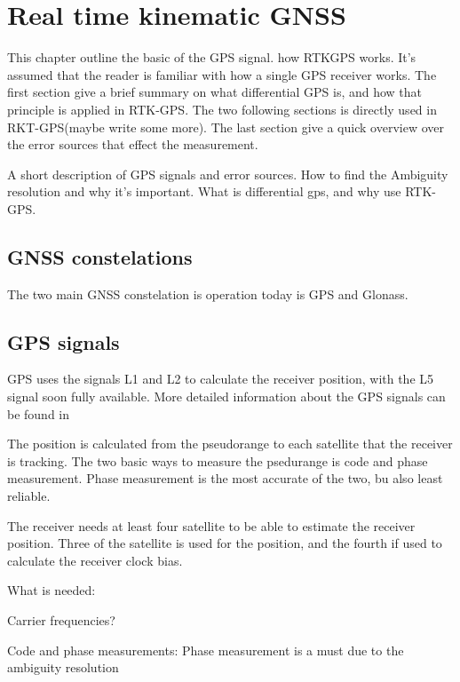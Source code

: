 
\chapter{Real time kinematic GNSS}
This chapter outline the basic of the GPS signal. how RTKGPS works. It's assumed that the reader is familiar with how a single GPS receiver works. The first section give a brief summary on what differential GPS is, and how that principle is applied in RTK-GPS. The two following sections is directly used in RKT-GPS(maybe write some more). The last section give a quick overview over the error sources that effect the measurement.

A short description of GPS signals and error sources. How to find the Ambiguity resolution and why it's important. What is differential gps, and why use RTK-GPS.

\section{GNSS constelations}
The two main GNSS constelation is operation today is GPS and Glonass. 
\section{GPS signals}
GPS uses the signals L1 and L2 to calculate the receiver position, with the L5 signal soon fully available. More detailed information about the GPS signals can be found in \cite{GPSBOOK}

The position is calculated from the pseudorange to each satellite that the receiver is tracking. The two basic ways to measure the psedurange is code and phase measurement. Phase measurement is the most accurate of the two, bu also least reliable.

The receiver needs at least four satellite to be able to estimate the receiver position. Three of the satellite is used for the position, and the fourth if used to calculate the receiver clock bias. 

What is needed:

Carrier frequencies?

Code and phase measurements: Phase measurement is a must due to the ambiguity resolution

